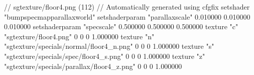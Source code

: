 // sgtexture/floor4.png (112)
// Automatically generated using cfgfix
setshader "bumpspecmapparallaxworld"
setshaderparam "parallaxscale" 0.010000 0.010000 0.010000
setshaderparam "specscale" 0.500000 0.500000 0.500000
texture "c" "sgtexture/floor4.png" 0 0 0 1.000000
texture "n" "sgtexture/specials/normal/floor4_n.png" 0 0 0 1.000000
texture "s" "sgtexture/specials/spec/floor4_s.png" 0 0 0 1.000000
texture "z" "sgtexture/specials/parallax/floor4_z.png" 0 0 0 1.000000

